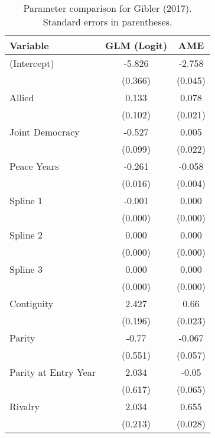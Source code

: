 \begin{table}[ht]
\centering
\begingroup\normalsize
\begin{tabular}{lcc}
 Variable & GLM (Logit) & AME \\ 
  \hline
\hline
(Intercept) & -5.826 & -2.758 \\ 
   & (0.366) & (0.045) \\ 
  Allied & 0.133 & 0.078 \\ 
   & (0.102) & (0.021) \\ 
  Joint Democracy & -0.527 & 0.005 \\ 
   & (0.099) & (0.022) \\ 
  Peace Years & -0.261 & -0.058 \\ 
   & (0.016) & (0.004) \\ 
  Spline 1 & -0.001 & 0.000 \\ 
   & (0.000) & (0.000) \\ 
  Spline 2 & 0.000 & 0.000 \\ 
   & (0.000) & (0.000) \\ 
  Spline 3 & 0.000 & 0.000 \\ 
   & (0.000) & (0.000) \\ 
  Contiguity & 2.427 & 0.66 \\ 
   & (0.196) & (0.023) \\ 
  Parity & -0.77 & -0.067 \\ 
   & (0.551) & (0.057) \\ 
  Parity at Entry Year & 2.034 & -0.05 \\ 
   & (0.617) & (0.065) \\ 
  Rivalry & 2.034 & 0.655 \\ 
   & (0.213) & (0.028) \\ 
   \hline
\hline
\end{tabular}
\endgroup
\caption{Parameter comparison for Gibler (2017). Standard errors in parentheses.} 
\label{tab:gibler_coef}
\end{table}
